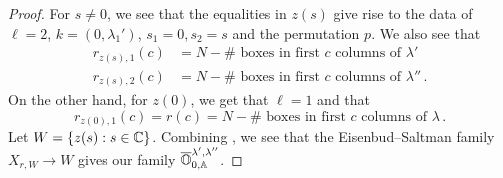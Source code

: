\documentclass[draft]{article} %
\begin{document}
\begin{proof}
For $ s \ne 0$, we see that the equalities in $ z(s) $ give rise to the data of 
\(\ell =2\), \(k = (0,\lambda_1')\), \(s_1 = 0, s_2 = s\) and the permutation $p$.
We also see that
\begin{equation} 
\label{eq:rcols}
    \begin{split}
            r_{z(s), 1}(c) &=  N - \#\text{~boxes in first $c$ columns of }\lambda' \\
            r_{z(s), 2}(c) &=  N - \#\text{~boxes in first $c$ columns of }\lambda'' \,. 
    \end{split}
\end{equation}
On the other hand, for $z(0)$, we get that $ \ell = 1$ and that 
\begin{equation} 
\label{eq:rcol2}
    r_{z(0),1}(c) = 
    r(c) = N - \#\text{~boxes in first $c$ columns of }\lambda\,. 
\end{equation}
% 
% 
% 
Let $ W = \{ z(s) : s \in \mathbb C \}$. Combining ,
we see that the Eisenbud--Saltman family $ X_{r, W} \rightarrow W $ gives our family $ \overline{\mathbb O}^{\lambda', \lambda''}_{0, \mathbb A}$.
\end{proof}
% 
% 
\end{document}
